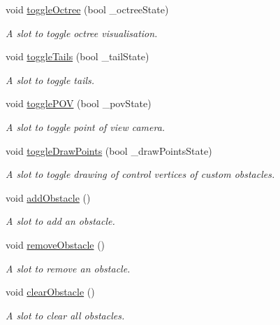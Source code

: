 \begin{DoxyCompactItemize}
void \hyperlink{classGLWindow_aec80ba5f39a1ec536c07f092b070917e}{toggleOctree} (bool \_\-octreeState)
\begin{DoxyCompactList}\small\item\em A slot to toggle octree visualisation. \item\end{DoxyCompactList}\item 
void \hyperlink{classGLWindow_a447a172182f361c2965bf25b21434441}{toggleTails} (bool \_\-tailState)
\begin{DoxyCompactList}\small\item\em A slot to toggle tails. \item\end{DoxyCompactList}\item 
void \hyperlink{classGLWindow_a46e729b49bf86b01acb2d9f00e992195}{togglePOV} (bool \_\-povState)
\begin{DoxyCompactList}\small\item\em A slot to toggle point of view camera. \item\end{DoxyCompactList}\item 
void \hyperlink{classGLWindow_a8e20f37b51be6b0d847444578c6ced2c}{toggleDrawPoints} (bool \_\-drawPointsState)
\begin{DoxyCompactList}\small\item\em A slot to toggle drawing of control vertices of custom obstacles. \item\end{DoxyCompactList}\item 
void \hyperlink{classGLWindow_a78fd529f5072ec167c68417d5c2359cc}{addObstacle} ()
\begin{DoxyCompactList}\small\item\em A slot to add an obstacle. \item\end{DoxyCompactList}\item 
void \hyperlink{classGLWindow_a4052a6aa46a2d66944e4d5192e089ddf}{removeObstacle} ()
\begin{DoxyCompactList}\small\item\em A slot to remove an obstacle. \item\end{DoxyCompactList}\item 
void \hyperlink{classGLWindow_a4fce0250c1cb58ebcc22b8764f38aa08}{clearObstacle} ()
\begin{DoxyCompactList}\small\item\em A slot to clear all obstacles. \item\end{DoxyCompactList}\item 

\end{DoxyCompactItemize}
